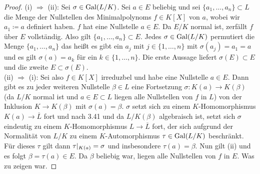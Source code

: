 \documentclass{scrartcl}
\begin{document}
\begin{proof}
    (i) $\Rightarrow$ (ii): Sei $\sigma\in \operatorname{Gal}(L/K)$. Sei $a\in E$ beliebig und sei $\{a_1,\ldots,a_n\}\subset L$ die Menge der Nullstellen des Minimalpolynoms $f\in K[X]$ von $a$, wobei wir $a_1\coloneqq a$ definiert haben. $f$ hat eine Nullstelle $a\in E$. Da $E/K$ normal ist, zerfällt $f$ über $E$ vollständig. Also gilt $\{a_1,\ldots,a_n\}\subset E$. Jedes $\sigma\in\operatorname{Gal}(L/K)$ permutiert die Menge $\{a_1,\ldots,a_n\}$ das heißt es gibt ein $a_j$ mit $j\in\{1,\ldots,n\}$ mit $\sigma(a_j)=a_1=a$ und es gilt $\sigma(a)=a_k$ für ein $k\in \{1,\ldots,n\}$. Die erste Aussage liefert $\sigma(E)\subset E$ und die zweite $E\subset \sigma(E)$.    
    \\(ii) $\Rightarrow$ (i): Sei also $f\in K[X]$ irreduzbel und habe eine Nullstelle $a\in E$. Dann gibt es zu jeder weiteren Nullstelle $\beta\in L$ eine Fortsetzung $\sigma:K(a)\to K(\beta)$ (da $L/K$ normal ist und $a\in E\subset L$ liegen alle Nullstellen von $f$ in $L$) von der Inklusion $K\to K(\beta)$ mit $\sigma(a)=\beta$. $\sigma$ setzt sich zu einem $K$-Homomorphismus $K(a)\to \overline{L}$ fort und nach 3.41 und da $L/K(\beta)$ algebraisch ist, setzt sich $\sigma$ eindeutig zu einem $K$-Homomorphismus $L\to\overline{L}$ fort, der sich aufgrund der Normalität von $L/K$ zu einem $K$-Automorphismus $\tau\in\operatorname{Gal}(L/K)$ beschränkt. Für dieses $\tau$ gilt dann $\tau|_{K(a)}=\sigma$ und insbesondere $\tau(a)=\beta$. Nun gilt (ii) und es folgt $\beta=\tau(a)\in E$. Da $\beta$ beliebig war, liegen alle Nullstellen von $f$ in $E$. Was zu zeigen war. 
\end{proof}
\end{document}

